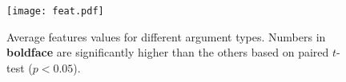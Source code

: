 %

%

\begin{figure}[t]
  \hspace{-4mm}
    \texttt{[image: feat.pdf]}
  \vspace{-5mm}
  \caption{\fontsize{10}{12}\selectfont Average features values for different argument types. Numbers in \textbf{boldface} are significantly higher than the others based on paired $t$-test ($p<0.05$).}
  \label{fig:pwttest}

\end{figure}





